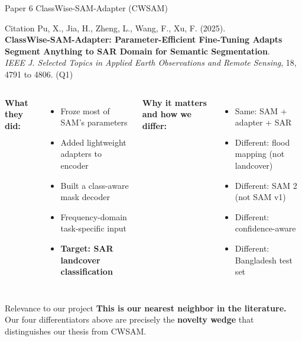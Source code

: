 \documentclass[10pt,aspectratio=169]{beamer}
\begin{document}
\begin{frame}{Paper 6 \quad ClassWise-SAM-Adapter (CWSAM)}
\begin{block}{Citation}
Pu, X., Jia, H., Zheng, L., Wang, F., Xu, F. (2025). \\
\textbf{ClassWise-SAM-Adapter: Parameter-Efficient Fine-Tuning Adapts Segment Anything to SAR Domain for Semantic Segmentation}. \\
\textit{IEEE J. Selected Topics in Applied Earth Observations and Remote Sensing}, 18, 4791 to 4806. \quad \textcolor{primaryblue}{(Q1)}
\end{block}

\begin{columns}[T,onlytextwidth]
\textbf{What they did:}
\begin{itemize}
\item Froze most of SAM's parameters
\item Added lightweight adapters to encoder
\item Built a class-aware mask decoder
\item Frequency-domain task-specific input
\item \textbf{Target: SAR landcover classification}
\end{itemize}

\textbf{Why it matters and how we differ:}
\begin{itemize}
\item \textcolor{accentorange}{Same:} SAM + adapter + SAR
\item \textcolor{softgreen}{Different:} flood mapping (not landcover)
\item \textcolor{softgreen}{Different:} SAM 2 (not SAM v1)
\item \textcolor{softgreen}{Different:} confidence-aware
\item \textcolor{softgreen}{Different:} Bangladesh test set
\end{itemize}
\end{columns}

\vspace{0.5em}
\begin{alertblock}{Relevance to our project}
\textbf{This is our nearest neighbor in the literature.} Our four differentiators above are precisely the \textbf{novelty wedge} that distinguishes our thesis from CWSAM.
\end{alertblock}
\end{frame}
\end{document}

